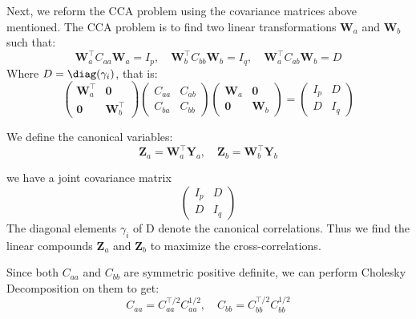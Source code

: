 Next, we reform the CCA problem using the covariance matrices above mentioned. The CCA problem is to find two linear transformations $\mathbf{W}_a$ and $\mathbf{W}_b$ such that:
\begin{equation}
     \mathbf{W}_a^\top C_{aa} \mathbf{W}_a = I_p, \quad  \mathbf{W}_b^\top C_{bb} \mathbf{W}_b = I_q, \quad  \mathbf{W}_a^\top C_{ab}  \mathbf{W}_b = D
\end{equation}
Where $D=\diag (\gamma_i)$, that is:
\begin{equation}
\begin{pmatrix}
     \mathbf{W}_a^\top & {\mathbf 0}\\
    {\mathbf 0} &  \mathbf{W}_b^\top
    \end{pmatrix}
    \begin{pmatrix}
    C_{aa} & C_{ab}\\
    C_{ba} & C_{bb}
    \end{pmatrix}
    \begin{pmatrix}
     \mathbf{W}_a & {\mathbf 0}\\
    {\mathbf 0} &  \mathbf{W}_b
    \end{pmatrix}
    =
    \begin{pmatrix}
    I_p & D\\
    D & I_q
\end{pmatrix}
\end{equation}


We define the canonical variables:
\begin{equation}
    \mathbf{Z}_a= \mathbf{W}_a^\top \mathbf{Y}_a, \quad \mathbf{Z}_b = \mathbf{W}_b^\top \mathbf{Y}_b
\end{equation}

we have a joint covariance matrix
\begin{equation}
    \begin{pmatrix}
    I_p & D \\
    D & I_q
    \end{pmatrix}
\end{equation}
The diagonal elements $\gamma_i$ of D denote the canonical correlations. Thus we find the linear compounds $\mathbf{Z}_a$ and $\mathbf{Z}_b$ to maximize the cross-correlations. 

Since both $C_{aa}$ and $C_{bb}$ are symmetric positive definite, we can perform Cholesky Decomposition on them to get:
\begin{equation}
    C_{aa} = C_{aa}^{\top/2} C_{aa}^{1/2}, \quad C_{bb} = C_{bb}^{\top/2} C_{bb}^{1/2}
\end{equation}

